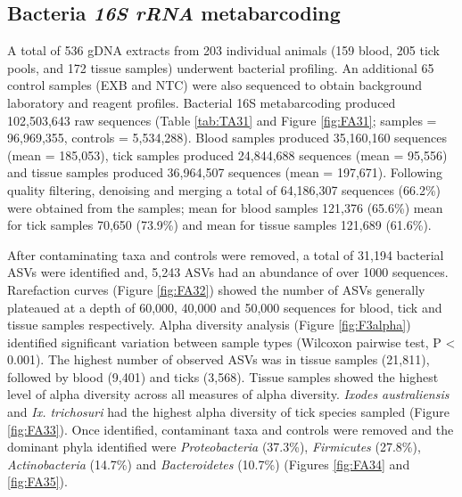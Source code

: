 \documentclass[a4paper, nobind]{templates/ociamthesis}
\begin{document}
\hypertarget{bacteria-16s-rrna-metabarcoding}{%
\subsection{\texorpdfstring{Bacteria \emph{16S rRNA} metabarcoding}{Bacteria 16S rRNA metabarcoding}}\label{bacteria-16s-rrna-metabarcoding}}

A total of 536 gDNA extracts from 203 individual animals (159 blood, 205 tick pools, and 172 tissue samples) underwent bacterial profiling.
An additional 65 control samples (EXB and NTC) were also sequenced to obtain background laboratory and reagent profiles.
Bacterial 16S metabarcoding produced 102,503,643 raw sequences (Table \ref{tab:TA31} and Figure \ref{fig:FA31}; samples = 96,969,355, controls = 5,534,288).
Blood samples produced 35,160,160 sequences (mean = 185,053), tick samples produced 24,844,688 sequences (mean = 95,556) and tissue samples produced 36,964,507 sequences (mean = 197,671).
Following quality filtering, denoising and merging a total of 64,186,307 sequences (66.2\%) were obtained from the samples; mean for blood samples 121,376 (65.6\%) mean for tick samples 70,650 (73.9\%) and mean for tissue samples 121,689 (61.6\%).

After contaminating taxa and controls were removed, a total of 31,194 bacterial ASVs were identified and, 5,243 ASVs had an abundance of over 1000 sequences.
Rarefaction curves (Figure \ref{fig:FA32}) showed the number of ASVs generally plateaued at a depth of 60,000, 40,000 and 50,000 sequences for blood, tick and tissue samples respectively.
Alpha diversity analysis (Figure \ref{fig:F3alpha}) identified significant variation between sample types (Wilcoxon pairwise test, P \textless{} 0.001).
The highest number of observed ASVs was in tissue samples (21,811), followed by blood (9,401) and ticks (3,568).
Tissue samples showed the highest level of alpha diversity across all measures of alpha diversity.
\emph{Ixodes australiensis} and \emph{Ix. trichosuri} had the highest alpha diversity of tick species sampled (Figure \ref{fig:FA33}).
Once identified, contaminant taxa and controls were removed and the dominant phyla identified were \emph{Proteobacteria} (37.3\%), \emph{Firmicutes} (27.8\%), \emph{Actinobacteria} (14.7\%) and \emph{Bacteroidetes} (10.7\%) (Figures \ref{fig:FA34} and \ref{fig:FA35}).
\end{document}
